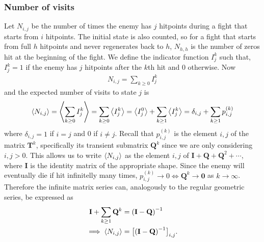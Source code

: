 \subsubsection{Number of visits}
Let $N_{i,j}$ be the number of times the enemy has $j$ hitpoints during a fight that starts from $i$ hitpoints. The initial state is also counted, so for a fight that starts from full $h$ hitpoints and never regenerates back to $h$, $N_{h,h}$ is the number of zeros hit at the beginning of the fight. We define the indicator function $I_j^k$ such that, $I_j^k = 1$ if the enemy has $j$ hitpoints after the $k$th hit and $0$ otherwise. Now
\begin{align}
	N_{i,j} = \sum_{k\geq 0}I_j^k
\end{align}
and the expected number of visits to state $j$ is
\begin{align}
	\left\langle N_{i,j} \right\rangle
	= \left\langle \sum_{k\geq 0}I_j^k \right\rangle
	= \sum_{k\geq 0}\left\langle I_j^k \right\rangle
	= \left\langle I_j^0 \right\rangle + \sum_{k\geq 1}\left\langle I_j^k \right\rangle
	= \delta_{i,j} + \sum_{k\geq 1}p_{i,j}^{(k)}
\end{align}
where $\delta_{i,j} = 1$ if $i=j$ and 0 if $i\neq j$. Recall that $p_{i,j}^{(k)}$ is the element $i,j$ of the matrix $\mathbf{T}^k$, specifically its transient submatrix $\mathbf{Q}^k$ since we are only considering $i,j > 0$. This allows us to write $\left\langle N_{i,j} \right\rangle$ as the element $i,j$ of $\mathbf{I} + \mathbf{Q} + \mathbf{Q}^2 + \cdots$, where $\mathbf{I}$ is the identity matrix of the appropriate shape. Since the enemy will eventually die if hit infinitelly many times, $p_{i,j}^{(k)} \rightarrow 0 \iff \mathbf{Q}^k \rightarrow \mathbf{0}$ as $k \rightarrow \infty$. Therefore the infinite matrix series can, analogously to the regular geometric series, be expressed as
\begin{align}
	\mathbf{I} + \sum_{k\geq 1}\mathbf{Q}^k
	&= {(\mathbf{I} - \mathbf{Q})}^{-1}\nonumber\\
	\implies \left\langle N_{i,j} \right\rangle &= \big[{(\mathbf{I} - \mathbf{Q})}^{-1}\big]_{i,j}\label{eq:visitsMatrix}.
\end{align}

